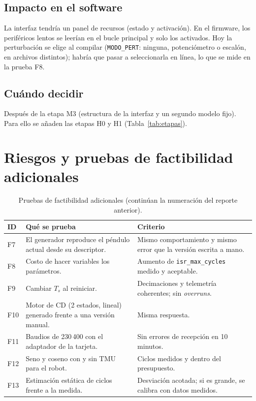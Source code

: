 \documentclass[12pt,letterpaper]{article}
\begin{document}
\subsection{Impacto en el software}

La interfaz tendría un panel de recursos (estado y activación). En el firmware, los periféricos lentos se leerían en el bucle principal y solo los activados. Hoy la perturbación se elige al compilar (\texttt{MODO\_PERT}: ninguna, potenciómetro o escalón, en archivos distintos); habría que pasar a seleccionarla en línea, lo que se mide en la prueba F8.

\subsection{Cuándo decidir}

Después de la etapa M3 (estructura de la interfaz y un segundo modelo fijo). Para ello se añaden las etapas H0 y H1 (Tabla~\ref{tab:etapas}).

\section{Riesgos y pruebas de factibilidad adicionales}
\label{sec:riesgos}

\begin{table}[!htbp]
\centering
\caption{Pruebas de factibilidad adicionales (continúan la numeración del reporte anterior).}
\label{tab:pruebas}
\begin{tabularx}{\textwidth}{>{\raggedright\arraybackslash}p{1.0cm}Y>{\raggedright\arraybackslash}p{4.4cm}}
\toprule
\textbf{ID} & \textbf{Qué se prueba} & \textbf{Criterio} \\
\midrule
F7 & El generador reproduce el péndulo actual desde su descriptor. & Mismo comportamiento y mismo error que la versión escrita a mano. \\
F8 & Costo de hacer variables los parámetros. & Aumento de \texttt{isr\_max\_cycles} medido y aceptable. \\
F9 & Cambiar $T_s$ al reiniciar. & Decimaciones y telemetría coherentes; sin \textit{overruns}. \\
F10 & Motor de CD (2 estados, lineal) generado frente a una versión manual. & Misma respuesta. \\
F11 & Baudios de 230\,400 con el adaptador de la tarjeta. & Sin errores de recepción en 10 minutos. \\
F12 & Seno y coseno con y sin TMU para el robot. & Ciclos medidos y dentro del presupuesto. \\
F13 & Estimación estática de ciclos frente a la medida. & Desviación acotada; si es grande, se calibra con datos medidos. \\
\bottomrule
\end{tabularx}
\end{table}
\end{document}

